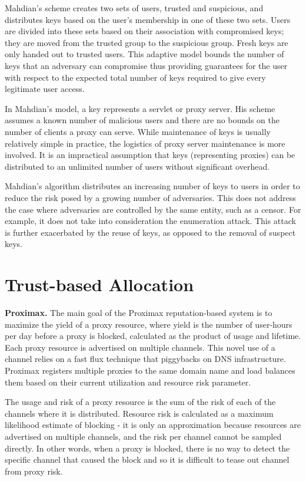Mahdian's scheme creates two sets of users, trusted and suspicious, and distributes keys based on the user's membership in one of these two sets. Users are divided into these sets based on their association with compromised keys; they are moved from the trusted group to the suspicious group. Fresh keys are only handed out to trusted users. This adaptive model bounds the number of keys that an adversary can compromise thus providing guarantees for the user with respect to the expected total number of keys required to give every legitimate user access.

In Mahdian's model, a key represents a servlet or proxy server. His scheme assumes a known number of malicious users and there are no bounds on the number of clients a proxy can serve. While maintenance of keys is usually relatively simple in practice, the logistics of proxy server maintenance is more involved. It is an impractical assumption that keys (representing proxies) can be distributed to an unlimited number of users without significant overhead. 

Mahdian's algorithm distributes an increasing number of keys to users in order to reduce the risk posed by a growing number of adversaries. This does not address the case where adversaries are controlled by the same entity, such as a censor. For example, it does not take into consideration the enumeration attack. This attack is further exacerbated by the reuse of keys, as opposed to the removal of suspect keys.\\


\section{Trust-based Allocation}


\textbf{Proximax.} The main goal of the Proximax \cite{mccoy2011proximax} reputation-based system is to maximize the yield of a proxy resource, where yield is the number of user-hours per day before a proxy is blocked, calculated as the product of usage and lifetime. Each proxy resource is advertised on multiple channels. This novel use of a channel relies on a fast flux technique that piggybacks on \ac{DNS} infrastructure. Proximax registers multiple proxies to the same domain name and load balances them based on their current utilization and resource risk parameter. 

The usage and risk of a proxy resource is the sum of the risk of each of the channels where it is distributed. Resource risk is calculated as a maximum likelihood estimate of blocking - it is only an approximation because resources are advertised on multiple channels, and the risk per channel cannot be sampled directly. In other words, when a proxy is blocked, there is no way to detect the specific channel that caused the block and so it is difficult to tease out channel from proxy risk. 

